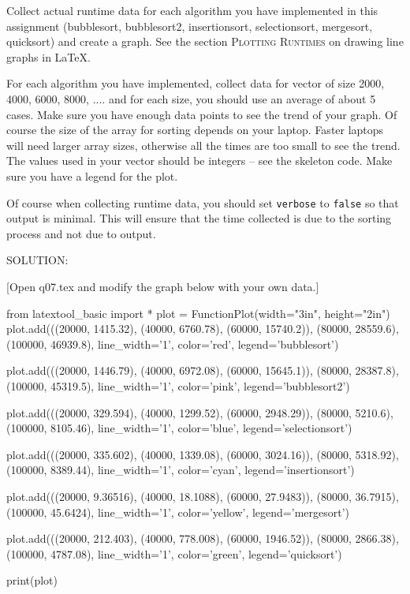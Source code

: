 Collect actual runtime data for each algorithm you have implemented in this
assignment
(bubblesort, bubblesort2, insertionsort, selectionsort,
mergesort, quicksort)
and create a graph.
See the section \textsc{Plotting Runtimes}
on drawing line graphs in \LaTeX.

For each algorithm you have implemented, collect data for 
vector of size 2000, 4000, 6000, 8000, ....
and for each size, you should use an average of about 5 cases.
Make sure you have enough data points to see the trend of your graph.
Of course the size of the array for sorting depends on your laptop.
Faster laptops will need larger array sizes, otherwise all the times
are too small to see the trend.
The values used in your vector should be integers --
see the skeleton code.
Make sure you have a legend for the plot.

Of course when collecting runtime data, you should set
\verb!verbose! to \verb!false! so that output is minimal.
This will ensure that the time collected is due to the sorting process
and not due to output.

SOLUTION:

[Open q07.tex and modify the graph below with your own data.]
\begin{python}
from latextool_basic import *
plot = FunctionPlot(width="3in", height="2in")
plot.add(((20000, 1415.32),
          (40000, 6760.78),
          (60000, 15740.2)),
          (80000, 28559.6),
          (100000, 46939.8),
          line_width='1', color='red', legend='bubblesort')

plot.add(((20000, 1446.79),
          (40000, 6972.08),
          (60000, 15645.1)),
          (80000, 28387.8),
          (100000, 45319.5),
          line_width='1', color='pink', legend='bubblesort2')

plot.add(((20000, 329.594),
          (40000, 1299.52),
          (60000, 2948.29)),
          (80000, 5210.6),
          (100000, 8105.46),
          line_width='1', color='blue', legend='selectionsort')

plot.add(((20000, 335.602),
          (40000, 1339.08),
          (60000, 3024.16)),
          (80000, 5318.92),
          (100000, 8389.44),
          line_width='1', color='cyan', legend='insertionsort')

plot.add(((20000, 9.36516),
          (40000, 18.1088),
          (60000, 27.9483)),
          (80000, 36.7915),
          (100000, 45.6424),
          line_width='1', color='yellow', legend='mergesort')

plot.add(((20000, 212.403),
          (40000, 778.008),
          (60000, 1946.52)),
          (80000, 2866.38),
          (100000, 4787.08),
          line_width='1', color='green', legend='quicksort')
          
print(plot)
\end{python}

